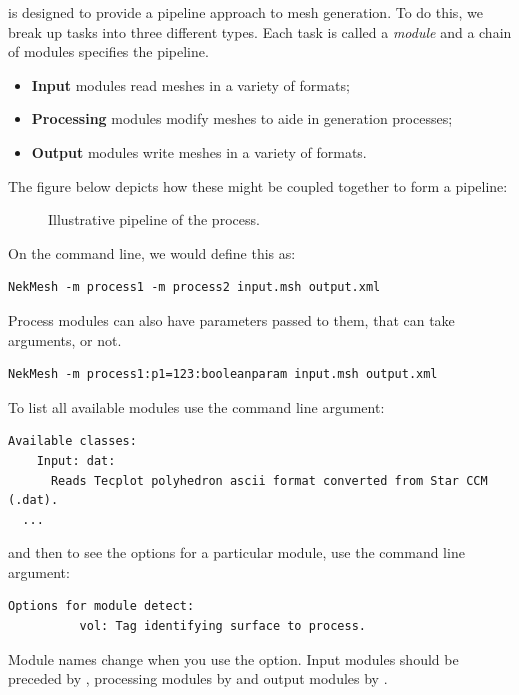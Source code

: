 \nm is designed to provide a pipeline approach to mesh generation. To do this,
we break up tasks into three different types. Each task is called a
\emph{module} and a chain of modules specifies the pipeline.
%
\begin{itemize}
  \item \textbf{Input} modules read meshes in a variety of formats;
  \item \textbf{Processing} modules modify meshes to aide in generation processes;
  \item \textbf{Output} modules write meshes in a variety of formats.
\end{itemize}
%
The figure below depicts how these might be coupled together to form a pipeline:
%
\begin{figure}
  \begin{center}
  \end{center}
  \caption{Illustrative pipeline of the \nm process.}
  \label{fig:util:mc:pipeline}
\end{figure}
%
On the command line, we would define this as:
%
\begin{lstlisting}[style=BashInputStyle]
  NekMesh -m process1 -m process2 input.msh output.xml
\end{lstlisting}
%
Process modules can also have parameters passed to them, that can take
arguments, or not.
%
\begin{lstlisting}[style=BashInputStyle]
  NekMesh -m process1:p1=123:booleanparam input.msh output.xml
\end{lstlisting}
%
To list all available modules use the  command line argument:
%
\begin{lstlisting}[style=BashInputStyle]
  Available classes:
    Input: dat:
      Reads Tecplot polyhedron ascii format converted from Star CCM (.dat).
  ...
\end{lstlisting}
%
and then to see the options for a particular module, use the  command
line argument:
%
\begin{lstlisting}[style=BashInputStyle]
  Options for module detect:
          vol: Tag identifying surface to process.
\end{lstlisting}
%
\begin{notebox}
  Module names change when you use the  option. Input modules should
  be preceded by , processing modules by  and output
  modules by .
\end{notebox}

